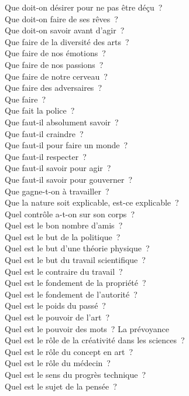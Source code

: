 \documentclass[a4paper,12pt]{article}
\begin{document}
Que doit-on désirer pour ne pas être déçu ? \\
Que doit-on faire de ses rêves ? \\
Que doit-on savoir avant d'agir ? \\
Que faire de la diversité des arts ? \\
Que faire de nos émotions ? \\
Que faire de nos passions ? \\
Que faire de notre cerveau ? \\
Que faire des adversaires ? \\
Que faire ? \\
Que fait la police ? \\
Que faut-il absolument savoir ? \\
Que faut-il craindre ? \\
Que faut-il pour faire un monde ? \\
Que faut-il respecter ? \\
Que faut-il savoir pour agir ? \\
Que faut-il savoir pour gouverner ? \\
Que gagne-t-on à travailler ? \\
Que la nature soit explicable, est-ce explicable ? \\
Quel contrôle a-t-on sur son corps ? \\
Quel est le bon nombre d'amis ? \\
Quel est le but de la politique ? \\
Quel est le but d'une théorie physique ? \\
Quel est le but du travail scientifique ? \\
Quel est le contraire du travail ? \\
Quel est le fondement de la propriété ? \\
Quel est le fondement de l'autorité ? \\
Quel est le poids du passé ? \\
Quel est le pouvoir de l'art ? \\
Quel est le pouvoir des mots ? La prévoyance \\
Quel est le rôle de la créativité dans les sciences ? \\
Quel est le rôle du concept en art ? \\
Quel est le rôle du médecin ? \\
Quel est le sens du progrès technique ? \\
Quel est le sujet de la pensée ? \\
\end{document}
